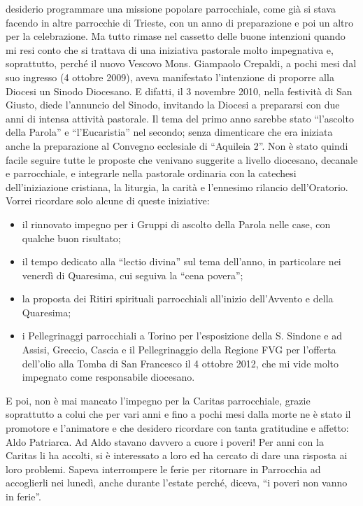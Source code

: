 desiderio programmare una missione popolare parrocchiale, come già si stava facendo in altre 
parrocchie di Trieste, con un anno di preparazione e poi un altro per la celebrazione. 
Ma tutto rimase nel cassetto delle buone intenzioni quando mi resi conto che si trattava di una 
iniziativa pastorale molto impegnativa e, soprattutto, perché il nuovo Vescovo Mons. Giampaolo 
Crepaldi, a pochi mesi dal suo ingresso (4 ottobre 2009), aveva manifestato l'intenzione di proporre 
alla Diocesi un Sinodo Diocesano. 
E difatti, il 3 novembre 2010, nella festività di San Giusto, diede l'annuncio del Sinodo, invitando la 
Diocesi a prepararsi con due anni di intensa attività pastorale. 
Il tema del primo anno sarebbe stato “l'ascolto della Parola” e “l'Eucaristia” nel secondo; senza 
dimenticare che era iniziata anche la preparazione al Convegno ecclesiale di “Aquileia 2”.
Non è stato quindi facile seguire tutte le proposte che venivano suggerite a livello diocesano, 
decanale e parrocchiale, e integrarle nella pastorale ordinaria con la catechesi dell'iniziazione 
cristiana, la liturgia, la carità e l'ennesimo rilancio dell'Oratorio. 
Vorrei ricordare solo alcune di queste iniziative:
\begin{itemize}
	\item il rinnovato impegno per i Gruppi di ascolto della Parola nelle case, con qualche buon risultato;
	\item il tempo dedicato alla “lectio divina” sul tema dell'anno, in particolare nei venerdì di Quaresima, 
cui seguiva la “cena povera”;
	\item la proposta dei Ritiri spirituali parrocchiali all'inizio dell'Avvento e della Quaresima;
	\item i Pellegrinaggi parrocchiali a Torino per l'esposizione della S. Sindone e ad Assisi, Greccio, 
Cascia e il Pellegrinaggio della Regione FVG per l'offerta dell'olio alla Tomba di San Francesco il 4 
ottobre 2012, che mi vide molto impegnato come responsabile diocesano.
\end{itemize}
E poi, non è mai mancato l'impegno per la Caritas parrocchiale, grazie soprattutto a colui 
che per vari anni e fino a pochi mesi dalla morte ne è stato il promotore e l'animatore e che desidero 
ricordare con tanta gratitudine e affetto: Aldo Patriarca. 
Ad Aldo stavano davvero a cuore i poveri! Per anni con la Caritas li ha accolti, si è interessato a 
loro ed ha cercato di dare una risposta ai loro problemi.
Sapeva interrompere le ferie per ritornare in Parrocchia ad accoglierli nei lunedì, anche durante 
l'estate perché, diceva, “i poveri non vanno in ferie”.

